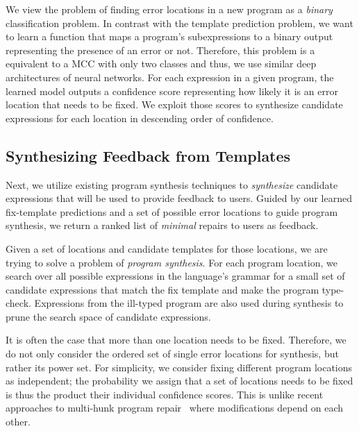  We view the problem of finding error locations
in a new program as a \emph{binary} classification problem. In contrast with the
template prediction problem, we want to learn a function that maps a program's
subexpressions to a binary output representing the presence of an error or not.
Therefore, this problem is a equivalent to a MCC with only two classes and thus,
we use similar deep architectures of neural networks. For each expression in a
given program, the learned model outputs a confidence score representing how
likely it is an error location that needs to be fixed. We exploit those scores
to synthesize candidate expressions for each location in descending order of
confidence.

\subsection{Synthesizing Feedback from Templates}
\label{sec:overview:synthesis}

Next, we utilize existing program synthesis techniques to \emph{synthesize}
candidate expressions that will be used to provide feedback to users. 
Guided by our learned fix-template predictions and a set of
possible error locations to guide program synthesis, we return a ranked
list of \emph{minimal} repairs to users as feedback.

 Given a set of locations and candidate templates for
those locations, we are trying to solve a problem of \emph{program synthesis}.
For each program location, we search over all possible
expressions in the language's grammar for a small set of candidate
expressions that match the fix template and make the program type-check.
Expressions from the ill-typed program are also used during synthesis 
to prune the search space of candidate expressions.

It is often the case that more than one location needs to be fixed. Therefore,
we do not only consider the ordered set of single error locations for synthesis,
but rather its power set. For simplicity, we consider fixing different program
locations as independent; the probability we assign that a set of locations
needs to be fixed is thus the product their individual confidence scores. This
is unlike recent approaches to multi-hunk program repair~\citep{Saha_2019} 
where modifications depend on each other.

